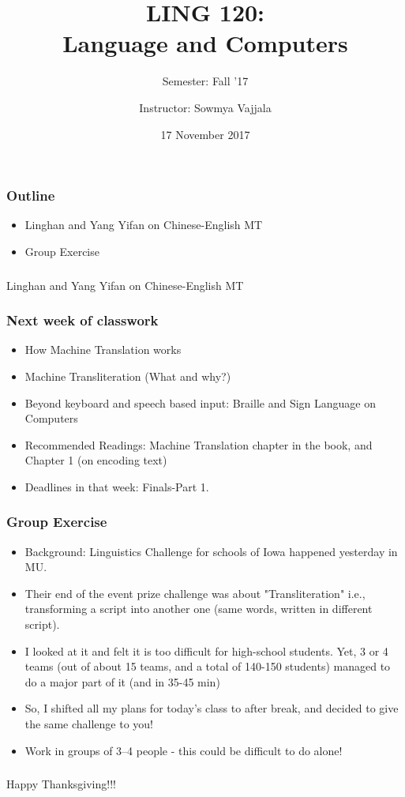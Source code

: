 \documentclass{beamer}
\author[Sowmya Vajjala]{Instructor: Sowmya Vajjala}
\title[LING 120]{LING 120: \\ Language and Computers}
\subtitle{Semester: Fall '17}
\date{17 November 2017}
\institute{Iowa State University, USA}
\begin{document}
\begin{frame}\titlepage
\end{frame}

\begin{frame}
\frametitle{Outline}
\begin{itemize}
\item Linghan and Yang Yifan on Chinese-English MT 
\item Group Exercise
\end{itemize}
\end{frame}

\begin{frame}
\frametitle{}
\centering
\Large Linghan and Yang Yifan on Chinese-English MT 
\end{frame}

\begin{frame}
\frametitle{Next week of classwork}
\begin{itemize}
\item How Machine Translation works
\item Machine Transliteration (What and why?)
\item Beyond keyboard and speech based input: Braille and Sign Language on Computers
\item Recommended Readings: Machine Translation chapter in the book, and Chapter 1 (on encoding text)
\item Deadlines in that week: Finals-Part 1.
\end{itemize}
\end{frame}

\begin{frame}
\frametitle{Group Exercise}
\begin{itemize}
\item Background: Linguistics Challenge for schools of Iowa happened yesterday in MU.
\item Their end of the event prize challenge was about "Transliteration" i.e., transforming a script into another one (same words, written in different script).  \pause
\item I looked at it and felt it is too difficult for high-school students. Yet, 3 or 4 teams (out of about 15 teams, and a total of 140-150 students) managed to do a major part of it (and in 35-45 min)
\item So, I shifted all my plans for today's class to after break, and decided to give the same challenge to you!
\item Work in groups of 3--4 people - this could be difficult to do alone!
\end{itemize}
\end{frame}

\begin{frame}
\frametitle{}
\centering
\Large Happy Thanksgiving!!!
\end{frame}
\end{document}
